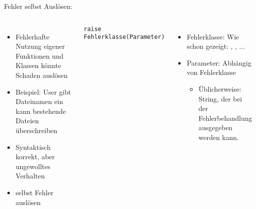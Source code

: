 
\begin{frame}[fragile]{Fehler selbst Auslösen: }
%
\begin{columns}[T]
\begin{itemize}
\item Fehlerhafte Nutzung eigener Funktionen und Klassen könnte Schaden auslösen
\item Beispiel: User gibt Dateinamen ein \Thus kann bestehende Dateien überschreiben
\item Syntaktisch korrekt, aber ungewolltes Verhalten
\item[\Thus] selbst Fehler auslösen
\end{itemize}
%
\begin{codebox}
\begin{verbatim}
raise Fehlerklasse(Parameter)
\end{verbatim}
\end{codebox}
%
\begin{itemize}
\item Fehlerklasse: Wie schon gezeigt: , , ...
\item Parameter: Abhängig von Fehlerklasse
	\begin{itemize}
	\item Üblicherweise: String, der bei der Fehlerbehandlung ausgegeben werden kann.
	\end{itemize}
\end{itemize}
\end{columns}
%
\end{frame}


